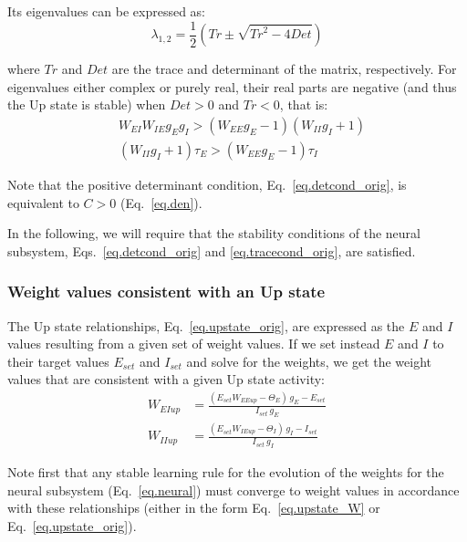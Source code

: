 \documentclass[
twocolumn,
]{article}
\newcommand{\EE}{\mathit{EE}}
\newcommand{\EI}{\mathit{EI}}
\newcommand{\IE}{\mathit{IE}}
\newcommand{\II}{\mathit{II}}
\newcommand{\set}{\mathit{set}}
\newcommand{\up}{\mathit{up}}
\newcommand{\De}{\mathit{Det}}
\newcommand{\Tr}{\mathit{Tr}}
\begin{document}
\noindent Its eigenvalues can be expressed as:
\begin{equation}
\lambda_{1,2} = \frac{1}{2}\left(\Tr \pm \sqrt{\Tr^2 - 4\De} \right)
\label{eq.neural.eigvals}
\end{equation}

\noindent where $\Tr$ and $\De$ are the trace and determinant of the matrix, respectively. For eigenvalues either complex or purely real, their real parts are negative (and thus the Up state is stable) when $\De>0$ and $\Tr<0$, that is:
\begin{eqnarray}
& W_{\EI} W_{\IE} g_E g_I > (W_{\EE} g_E - 1)(W_{\II} g_I + 1) \label{eq.detcond_orig}\\
& (W_{\II} g_I + 1)\tau_E > (W_{\EE} g_E - 1)\tau_I
\label{eq.tracecond_orig}
\end{eqnarray}

\noindent Note that the positive determinant condition, Eq.\ \ref{eq.detcond_orig}, is equivalent to $C>0$ (Eq.\ \ref{eq.den}).

In the following, we will require that the stability conditions of the neural subsystem, Eqs.\ \ref{eq.detcond_orig} and \ref{eq.tracecond_orig}, are satisfied.



\subsubsection{Weight values consistent with an Up state}

The Up state relationships, Eq.\ \ref{eq.upstate_orig}, are expressed as the $E$ and $I$ values resulting from a given set of weight values. If we set instead $E$ and $I$ to their target values $E_{\set}$ and $I_{\set}$ and solve for the weights, we get the weight values that are consistent with a given Up state activity:
\begin{equation}
\begin{aligned}
W_{\EI\up} & = \frac{(E_{\set} W_{\EE\up} - \Theta_E) \, g_E - E_{\set}}{I_{\set} \, g_E} \\
W_{\II\up} & = \frac{(E_{\set} W_{\IE\up} - \Theta_I) \, g_I - I_{\set}}{I_{\set} \, g_I}
\end{aligned}
\label{eq.upstate_W}
\end{equation}

\noindent Note first that any stable learning rule for the evolution of the weights for the neural subsystem (Eq.\ \ref{eq.neural}) must converge to weight values in accordance with these relationships (either in the form Eq.\ \ref{eq.upstate_W} or Eq.\ \ref{eq.upstate_orig}).
\end{document}
